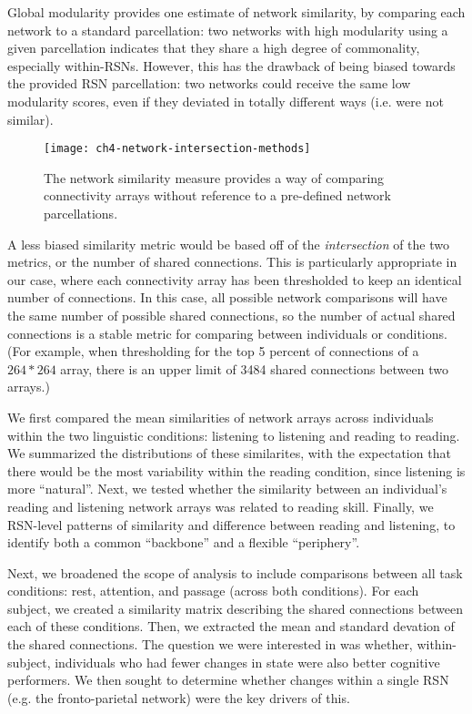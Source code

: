 Global modularity provides one estimate of network similarity, by comparing each network to a standard parcellation: two networks with high modularity using a given parcellation indicates that they share a high degree of commonality, especially within-RSNs. However, this has the drawback of being biased towards the provided RSN parcellation: two networks could receive the same low modularity scores, even if they deviated in totally different ways (i.e. were not similar). 

\begin{figure}[t]
	\centering
	\texttt{[image: ch4-network-intersection-methods]}
    \caption[Method for comparing connectivity arrays.]{The network similarity measure provides a way of comparing connectivity arrays without reference to a pre-defined network parcellations.}
	\label{fig:ch4-network-intersection-methods}
\end{figure}

A less biased similarity metric would be based off of the \textit{intersection} of the two metrics, or the number of shared connections. This is particularly appropriate in our case, where each connectivity array has been thresholded to keep an identical number of connections. In this case, all possible network comparisons will have the same number of possible shared connections, so the number of actual shared connections is a stable metric for comparing between individuals or conditions. (For example, when thresholding for the top 5 percent of connections of a $264 * 264$ array, there is an upper limit of 3484 shared connections between two arrays.) 

We first compared the mean similarities of network arrays across individuals within the two linguistic conditions: listening to listening and reading to reading. We summarized the distributions of these similarites, with the expectation that there would be the most variability within the reading condition, since listening is more ``natural''. Next, we tested whether the similarity between an individual's reading and listening network arrays was related to reading skill. Finally, we RSN-level patterns of similarity and difference between reading and listening, to identify both a common ``backbone'' and a flexible ``periphery''. 

Next, we broadened the scope of analysis to include comparisons between all task conditions: rest, attention, and passage (across both conditions). For each subject, we created a similarity matrix describing the shared connections between each of these conditions. Then, we extracted the mean and standard devation of the shared connections. The question we were interested in was whether, within-subject, individuals who had fewer changes in state were also better cognitive performers. We then sought to determine whether changes within a single RSN (e.g. the fronto-parietal network) were the key drivers of this. 


